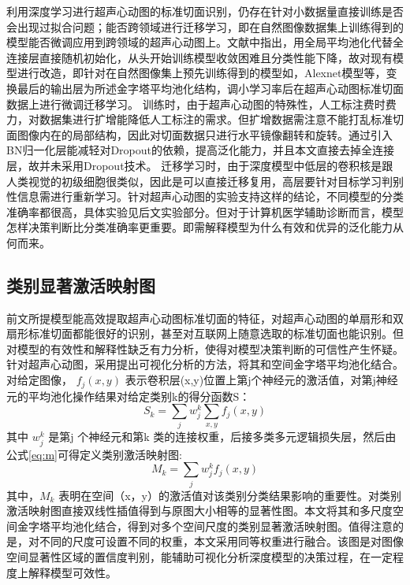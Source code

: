    利用深度学习进行超声心动图的标准切面识别，仍存在针对小数据量直接训练是否会出现过拟合问题；能否跨领域进行迁移学习，即在自然图像数据集上训练得到的模型能否微调应用到跨领域的超声心动图上。文献中指出，用全局平均池化代替全连接层直接随机初始化，从头开始训练模型收敛困难且分类性能下降，故对现有模型进行改造，即针对在自然图像集上预先训练得到的模型如，Alexnet模型等，变换最后的输出层为所述金字塔平均池化结构，调小学习率后在超声心动图标准切面数据上进行微调迁移学习。
训练时，由于超声心动图的特殊性，人工标注费时费力，对数据集进行扩增能降低人工标注的需求。但扩增数据需注意不能打乱标准切面图像内在的局部结构，因此对切面数据只进行水平镜像翻转和旋转。通过引入BN归一化层能减轻对Dropout的依赖，提高泛化能力，并且本文直接去掉全连接层，故并未采用Dropout技术。
迁移学习时，由于深度模型中低层的卷积核是跟人类视觉的初级细胞很类似，因此是可以直接迁移复用，高层要针对目标学习判别性信息需进行重新学习\citep{Zhou2015}。针对超声心动图的实验支持这样的结论，不同模型的分类准确率都很高，具体实验见后文实验部分。但对于计算机医学辅助诊断而言，模型怎样决策判断比分类准确率更重要。即需解释模型为什么有效和优异的泛化能力从何而来。
\subsection{类别显著激活映射图}

 前文所提模型能高效提取超声心动图标准切面的特征，对超声心动图的单扇形和双扇形标准切面都能很好的识别，甚至对互联网上随意选取的标准切面也能识别。但对模型的有效性和解释性缺乏有力分析，使得对模型决策判断的可信性产生怀疑。
针对超声心动图，采用提出可视化分析的方法，将其和空间金字塔平均池化结合。对给定图像， $f_{j}(x,y)$ 表示卷积层(x,y)位置上第j个神经元的激活值，对第j神经元的平均池化操作结果对给定类别k的得分函数S：
\begin{equation} \label{eq:s}
     S_{k}=\sum_{j}w_{j}^{k}\sum_{x,y}f_{j}(x,y)
\end{equation}	    
其中 $w_{j}^{k}$ 是第j 个神经元和第k 类的连接权重，后接多类多元逻辑损失层，然后由公式\ref{eq:m}可得定义类别激活映射图:	
  	      \begin{equation} \label{eq:m}
     M_{k}=\sum_{j}w_{j}^{k}f_{j}(x,y)
\end{equation}
其中，$M_{k}$ 表明在空间（x，y）的激活值对该类别分类结果影响的重要性。对类别激活映射图直接双线性插值得到与原图大小相等的显著性图。本文将其和多尺度空间金字塔平均池化结合，得到对多个空间尺度的类别显著激活映射图。值得注意的是，对不同的尺度可设置不同的权重，本文采用同等权重进行融合。该图是对图像空间显著性区域的置信度判别，能辅助可视化分析深度模型的决策过程，在一定程度上解释模型可效性。

